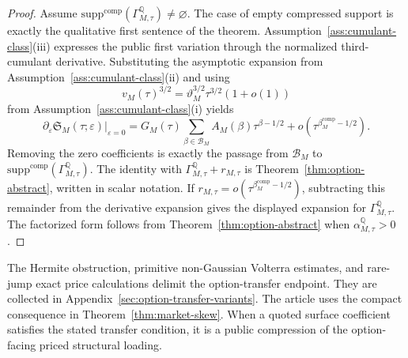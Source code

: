 \documentclass[11pt,a4paper]{amsart}
\theoremstyle{plain}
\theoremstyle{definition}
\theoremstyle{remark}
\newcommand{\QQ}{\mathbb{Q}}
\begin{document}
\begin{proof}
Assume \(\mathrm{supp}^{\mathrm{comp}}(\Gamma_{M,\tau}^\QQ)\neq\varnothing\).  The case of empty
compressed support is exactly the qualitative first sentence of the theorem.
Assumption~\ref{ass:cumulant-class}(iii) expresses the public first variation through the
normalized third-cumulant derivative.  Substituting the asymptotic expansion from
Assumption~\ref{ass:cumulant-class}(ii) and using
\[
        v_M(\tau)^{3/2}
        =
        \vartheta_M^{3/2}\tau^{3/2}(1+o(1))
\]
from Assumption~\ref{ass:cumulant-class}(i) yields
\[
        \partial_\varepsilon
        \mathfrak S_M(\tau;\varepsilon)\big|_{\varepsilon=0}
        =
        G_M(\tau)\sum_{\beta\in\mathcal B_M} A_M(\beta)\tau^{\beta-1/2}
        +
        o\!\left(\tau^{\beta_M^{\mathrm{comp}}-1/2}\right).
\]
Removing the zero coefficients is exactly the passage from \(\mathcal B_M\) to
\(\mathrm{supp}^{\mathrm{comp}}(\Gamma_{M,\tau}^\QQ)\).  The identity with
\(\Gamma_{M,\tau}^\QQ+r_{M,\tau}\) is Theorem~\ref{thm:option-abstract}, written in scalar
notation.  If
\(r_{M,\tau}=o(\tau^{\beta_M^{\mathrm{comp}}-1/2})\), subtracting this remainder from the
derivative expansion gives the displayed expansion for \(\Gamma_{M,\tau}^\QQ\).  The factorized
form follows from Theorem~\ref{thm:option-abstract} when
\(\alpha_{M,\tau}^\QQ>0\).
\end{proof}


The Hermite obstruction, primitive non-Gaussian Volterra estimates, and rare-jump exact price
calculations delimit the option-transfer endpoint.  They are collected in
Appendix~\ref{sec:option-transfer-variants}.  The article uses the compact consequence in
Theorem~\ref{thm:market-skew}.  When a quoted surface coefficient satisfies the stated transfer
condition, it is a public compression of the option-facing priced structural loading.
\end{document}
